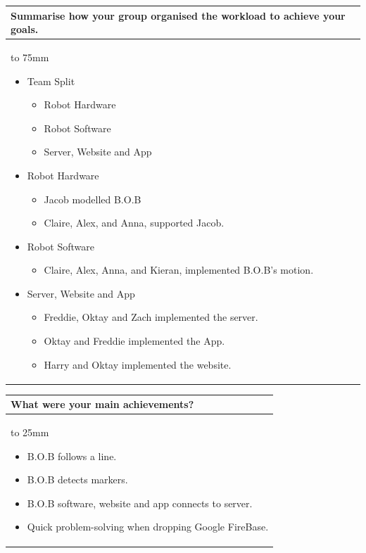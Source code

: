 \documentclass[a4paper]{article}
\newcommand{\colWidth}{141mm}
\begin{document}
\begin{center}
\begin{tabular}{|p{\colWidth}|}
	\hline
	\cellcolor{blue!25}\large
	\textbf{Summarise how your group organised the workload to achieve your goals.}
	\\ \hline
	\vtop to 75mm{
	\begin{itemize}
	    \item Team Split
	    \begin{itemize}
	        \item Robot Hardware
	        \item Robot Software
	        \item Server, Website and App 
	    \end{itemize}
	    \item Robot Hardware
	    \begin{itemize}
	        \item Jacob modelled B.O.B
	        \item Claire, Alex, and Anna, supported Jacob.
	    \end{itemize}
	    \item Robot Software
	    \begin{itemize}
	        \item Claire, Alex, Anna, and Kieran, implemented B.O.B's motion.
	    \end{itemize}
	    \item Server, Website and App 
	    \begin{itemize}
	        \item Freddie, Oktay and Zach implemented the server.
	        \item Oktay and Freddie implemented the App.
	        \item Harry and Oktay implemented the website.
	    \end{itemize}
	\end{itemize}
  }
  \\
  \hline
\end{tabular}
\vskip 5mm


\begin{tabular}{|p{\colWidth}|}
	\hline
	\cellcolor{blue!25}\large
	\textbf{What were your main achievements?}
	\\ \hline
	\vtop to 25mm{
	\begin{itemize}
	    \item B.O.B follows a line. 
	    \item B.O.B detects markers.
	    \item B.O.B software, website and app connects to server.
	    \item Quick problem-solving when dropping Google FireBase.
	\end{itemize}
  }
  \\
  \hline
\end{tabular}
\vskip 5mm


\end{center}
\end{document}
